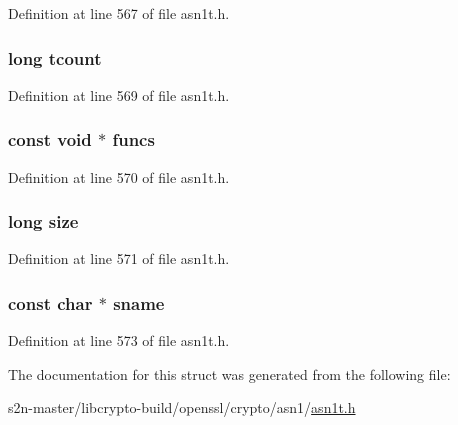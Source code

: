 Definition at line 567 of file asn1t.\+h.

\subsubsection[{\texorpdfstring{tcount}{tcount}}]{\setlength{\rightskip}{0pt plus 5cm}long tcount}\hypertarget{struct_a_s_n1___i_t_e_m__st_addaa9bceee14e996e59e6fd2b836286f}{}\label{struct_a_s_n1___i_t_e_m__st_addaa9bceee14e996e59e6fd2b836286f}


Definition at line 569 of file asn1t.\+h.

\subsubsection[{\texorpdfstring{funcs}{funcs}}]{\setlength{\rightskip}{0pt plus 5cm}const {\bf void} $\ast$ funcs}\hypertarget{struct_a_s_n1___i_t_e_m__st_a6b8ab4163543eac278e7d0b65885249b}{}\label{struct_a_s_n1___i_t_e_m__st_a6b8ab4163543eac278e7d0b65885249b}


Definition at line 570 of file asn1t.\+h.

\subsubsection[{\texorpdfstring{size}{size}}]{\setlength{\rightskip}{0pt plus 5cm}long size}\hypertarget{struct_a_s_n1___i_t_e_m__st_a37363161b41c4165b98cba7abc7a9d95}{}\label{struct_a_s_n1___i_t_e_m__st_a37363161b41c4165b98cba7abc7a9d95}


Definition at line 571 of file asn1t.\+h.

\subsubsection[{\texorpdfstring{sname}{sname}}]{\setlength{\rightskip}{0pt plus 5cm}const char $\ast$ sname}\hypertarget{struct_a_s_n1___i_t_e_m__st_a4b80c486312c118a491cc0d75a52d6e0}{}\label{struct_a_s_n1___i_t_e_m__st_a4b80c486312c118a491cc0d75a52d6e0}


Definition at line 573 of file asn1t.\+h.



The documentation for this struct was generated from the following file\+:\begin{DoxyCompactItemize}
\item 
s2n-\/master/libcrypto-\/build/openssl/crypto/asn1/\hyperlink{crypto_2asn1_2asn1t_8h}{asn1t.\+h}\end{DoxyCompactItemize}
